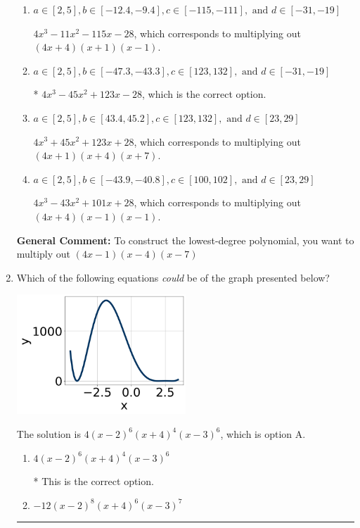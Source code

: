 \documentclass{extbook}[14pt]
\newcommand{\litem}[1]{\item #1

\rule{\textwidth}{0.4pt}}
\begin{document}
\begin{enumerate}
{\begin{enumerate}[label=\Alph*.]
$4x^{3} -45 x^{2} +123 x + 28$, which corresponds to multiplying everything correctly except the constant term.
\item \( a \in [2, 5], b \in [-12.4, -9.4], c \in [-115, -111], \text{ and } d \in [-31, -19] \)

$4x^{3} -11 x^{2} -115 x -28$, which corresponds to multiplying out $(4x + 4)(x + 1)(x -1)$.
\item \( a \in [2, 5], b \in [-47.3, -43.3], c \in [123, 132], \text{ and } d \in [-31, -19] \)

* $4x^{3} -45 x^{2} +123 x -28$, which is the correct option.
\item \( a \in [2, 5], b \in [43.4, 45.2], c \in [123, 132], \text{ and } d \in [23, 29] \)

$4x^{3} +45 x^{2} +123 x + 28$, which corresponds to multiplying out $(4x + 1)(x + 4)(x + 7)$.
\item \( a \in [2, 5], b \in [-43.9, -40.8], c \in [100, 102], \text{ and } d \in [23, 29] \)

$4x^{3} -43 x^{2} +101 x + 28$, which corresponds to multiplying out $(4x + 4)(x -1)(x -1)$.
\end{enumerate}

\textbf{General Comment:} To construct the lowest-degree polynomial, you want to multiply out $(4x -1)(x -4)(x -7)$
}
\litem{
Which of the following equations \textit{could} be of the graph presented below?

\begin{center}
    \includegraphics[width=0.5\textwidth]{../Figures/polyGraphToFunctionCopyB.png}
\end{center}



The solution is \( 4(x - 2)^{6} (x + 4)^{4} (x - 3)^{6} \), which is option A.\begin{enumerate}[label=\Alph*.]
\item \( 4(x - 2)^{6} (x + 4)^{4} (x - 3)^{6} \)

* This is the correct option.
\item \( -12(x - 2)^{8} (x + 4)^{6} (x - 3)^{7} \)


\end{enumerate}}
\end{enumerate}
\end{document}
